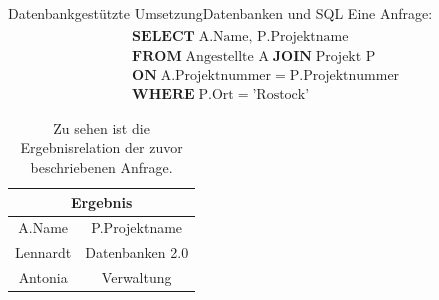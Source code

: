 \documentclass[10pt]{beamer} %
\begin{document}
\begin{frame}{Datenbankgestützte Umsetzung}{Datenbanken und SQL}
   Eine Anfrage:
   \begin{align*}
      \label{anf:bsp}
      \begin{split}
      & \mathbf{SELECT} \; \text{A.Name, P.Projektname}\\
      & \mathbf{FROM} \; \text{Angestellte A} \; \mathbf{JOIN} \; \text{Projekt P} \\ 
      &\mathbf{ON} \; \text{A.Projektnummer} = \text{P.Projektnummer}\\
      &\mathbf{WHERE} \; \text{P.Ort}=\text{'Rostock'}
  \end{split}
  \end{align*}
\pause
  \begin{table}[H]
   \centering
\begin{tabular}{|c|c|} \hline
   \multicolumn{2}{|c|}{\textbf{Ergebnis}} \\ \hline
   \hline
   A.Name & P.Projektname \\ 
   \hline
   Lennardt &Datenbanken 2.0 \\ 
   \hline
   Antonia &Verwaltung\\
   \hline
\end{tabular}
\caption[Ergebnisrelation einer SQL-Anfrage ]{Zu sehen ist die Ergebnisrelation der zuvor beschriebenen Anfrage.}
\label{abb:result_relation}
\end{table}
\end{frame}
\end{document}
